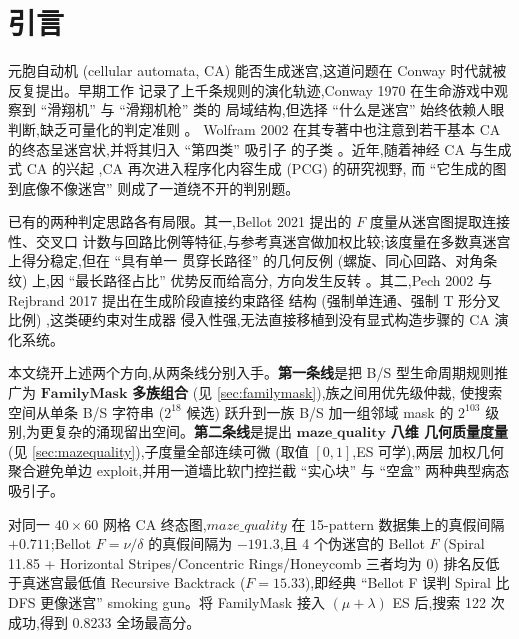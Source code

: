 
\section{引言}
\label{sec:intro}

元胞自动机 (cellular automata, CA) 能否生成迷宫,这道问题在 Conway 时代就被反复提出。早期工作
记录了上千条规则的演化轨迹,Conway 1970 在生命游戏中观察到 ``滑翔机'' 与 ``滑翔机枪'' 类的
局域结构,但选择 ``什么是迷宫'' 始终依赖人眼判断,缺乏可量化的判定准则 \cite{conway1970}。
Wolfram 2002 在其专著中也注意到若干基本 CA 的终态呈迷宫状,并将其归入 ``第四类'' 吸引子
的子类 \cite{wolfram2002}。近年,随着神经 CA 与生成式 CA 的兴起
\cite{mordvintsev2020, palm2022},CA 再次进入程序化内容生成 (PCG) 的研究视野,
而 ``它生成的图到底像不像迷宫'' 则成了一道绕不开的判别题。

已有的两种判定思路各有局限。其一,Bellot 2021 提出的 $F$ 度量从迷宫图提取连接性、交叉口
计数与回路比例等特征,与参考真迷宫做加权比较;该度量在多数真迷宫上得分稳定,但在 ``具有单一
贯穿长路径'' 的几何反例 (螺旋、同心回路、对角条纹) 上,因 ``最长路径占比'' 优势反而给高分,
方向发生反转 \cite{bellot2021}。其二,Pech 2002 与 Rejbrand 2017 提出在生成阶段直接约束路径
结构 (强制单连通、强制 T 形分叉比例) \cite{pech2002, rejbrand2017},这类硬约束对生成器
侵入性强,无法直接移植到没有显式构造步骤的 CA 演化系统。

本文绕开上述两个方向,从两条线分别入手。\textbf{第一条线}是把 B/S 型生命周期规则推广为
$\textbf{FamilyMask}$ \textbf{多族组合} (见 \ref{sec:familymask}),族之间用优先级仲裁,
使搜索空间从单条 B/S 字符串 ($2^{18}$ 候选) 跃升到一族 B/S 加一组邻域 mask 的 $2^{103}$
级别,为更复杂的涌现留出空间。\textbf{第二条线}是提出 $\textbf{maze\_quality}$ \textbf{八维
几何质量度量} (见 \ref{sec:mazequality}),子度量全部连续可微 (取值 $[0,1]$,ES 可学),两层
加权几何聚合避免单边 exploit,并用一道墙比软门控拦截 ``实心块'' 与 ``空盒'' 两种典型病态吸引子。

\begin{finding}
对同一 $40\!\times\! 60$ 网格 CA 终态图,$maze\_quality$ 在 15-pattern 数据集上的真假间隔
$+0.711$;Bellot $F = \nu/\delta$ 的真假间隔为 $-191.3$,且 4 个伪迷宫的 Bellot $F$
(Spiral 11.85 + Horizontal Stripes/Concentric Rings/Honeycomb 三者均为 0)
排名反低于真迷宫最低值 Recursive Backtrack ($F = 15.33$),即经典 ``Bellot F
误判 Spiral 比 DFS 更像迷宫'' smoking gun。将 FamilyMask 接入 $(\mu{+}\lambda)$
ES 后,搜索 122 次成功,得到 $0.8233$ 全场最高分。
\end{finding}

